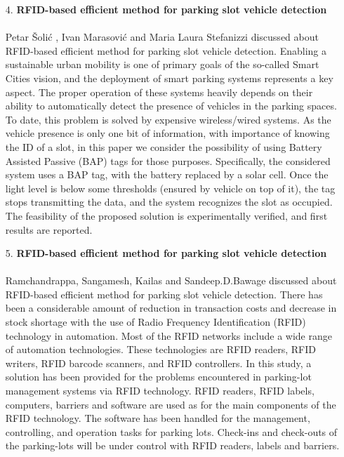 \documentclass[12pt,a4paper]{report}
\begin{document}
\begin{itemize}
	
	\item[ 4. ] \textbf{RFID-based efficient method for parking slot vehicle detection}\\\\
Petar Šolić  , Ivan Marasović and Maria Laura Stefanizzi discussed about RFID-based efficient method for parking slot vehicle detection.
	Enabling a sustainable urban mobility is one of primary goals of the so-called Smart Cities vision, and the deployment of smart parking systems represents a key aspect. The proper operation of these systems heavily depends on their ability to automatically detect the presence of vehicles in the parking spaces. To date, this problem is solved by expensive wireless/wired systems. As the vehicle presence is only one bit of information, with importance of knowing the ID of a slot, in this paper we consider the possibility of using Battery Assisted Passive (BAP) tags for those purposes. Specifically, the considered system uses a BAP tag, with the battery replaced by a solar cell. Once the light level is below some thresholds (ensured by vehicle on top of it), the tag stops transmitting the data, and the system recognizes the slot as occupied. The feasibility of the proposed solution is experimentally verified, and first results are reported.
	\item[ 5. ] \textbf{RFID-based efficient method for parking slot vehicle detection}\\\\
Ramchandrappa, Sangamesh, Kailas and Sandeep.D.Bawage discussed about RFID-based efficient method for parking slot vehicle detection.
	There   has   been   a   considerable   amount   of reduction in transaction costs and decrease in stock shortage with 
	the  use  of  Radio  Frequency  Identification  (RFID)  technology  in 	automation. Most of the RFID  networks include  a 
	wide range  of automation  technologies.  These  technologies  are  RFID readers, 
	RFID writers, RFID barcode scanners, and RFID controllers. In this study, a solution has been provided for the problems 
	encountered in parking-lot management systems via RFID 
	technology. RFID readers, RFID labels, computers, barriers  and 
	software  are  used  as  for  the  main  components  of  the
	RFID technology. The software has  been  handled for the  management, 
	controlling,  and  operation  tasks  for  parking  lots. 
	Check-ins  and 
	check-outs  of  the  parking-lots  will  be  under  control  with  RFID 
	readers, labels and barriers.
	

\end{itemize}
\end{document}
